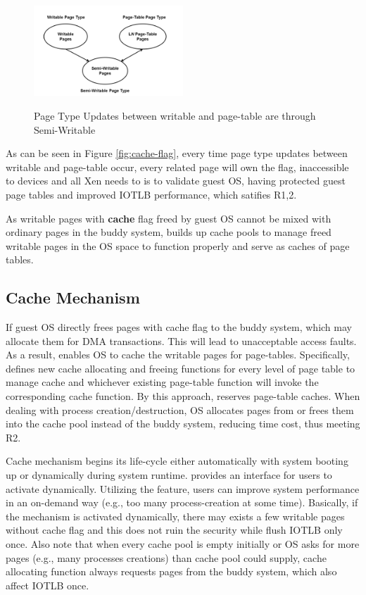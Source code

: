 \begin{figure}[ht]
\centering
\includegraphics[width=0.5\textwidth]{image/overview/page-type-updates-with-semi-type.png} \\
\caption{Page Type Updates between writable and page-table are through Semi-Writable}
\label{fig:semi-type}
\end{figure}

As can be seen in Figure \ref{fig:cache-flag}, every time page type updates between writable and page-table occur, every related page will own the flag, inaccessible to devices and all Xen needs to is to validate guest OS, having protected guest page tables and improved IOTLB performance, which satifies R1,2.

As writable pages with \textbf{cache} flag freed by guest OS cannot be mixed with ordinary pages in the buddy system, \name builds up cache pools to manage freed writable pages in the OS space to function properly and serve as caches of page tables.

\subsection{Cache Mechanism}
If guest OS directly frees pages with cache flag to the buddy system, which may allocate them for DMA transactions. This will lead to unacceptable access faults. As a result, \name enables OS to cache the writable pages for page-tables. Specifically, \name defines new cache allocating and freeing functions for every level of page table to manage cache and whichever existing page-table function will invoke the corresponding cache function. By this approach, \name reserves page-table caches. When dealing with process creation/destruction, OS allocates pages from or frees them into the cache pool instead of the buddy system, reducing time cost, thus meeting R2.

Cache mechanism begins its life-cycle either automatically with system booting up or dynamically during system runtime. \name provides an interface for users to activate dynamically. Utilizing the feature, users can improve system performance in an on-demand way (e.g., too many process-creation at some time). Basically, if the mechanism is activated dynamically, there may exists a few writable pages without cache flag and this does not ruin the security while flush IOTLB only once. Also note that when every cache pool is empty initially or OS asks for more pages (e.g., many processes creations) than cache pool could supply, cache allocating function always requests pages from the buddy system, which also affect IOTLB once.

